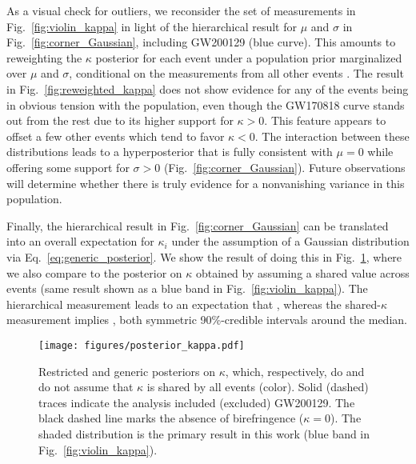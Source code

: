\documentclass[aps,prd,twocolumn,superscriptaddress,preprintnumbers,nofootinbib]{revtex4-2}
\begin{document}
As a visual check for outliers, we reconsider the set of measurements in Fig.~\ref{fig:violin_kappa} in light of the hierarchical result for $\mu$ and $\sigma$ in Fig.~\ref{fig:corner_Gaussian}, including GW200129 (blue curve).
This amounts to reweighting the $\kappa$ posterior for each event under a population prior marginalized over $\mu$ and $\sigma$, conditional on the measurements from all other events \cite{Miller2020,Callister:T2100301}.
The result in Fig.~\ref{fig:reweighted_kappa} does not show evidence for any of the events being in obvious tension with the population, even though the GW170818 curve stands out from the rest due to its higher support for $\kappa > 0$.
This feature appears to offset a few other events which tend to favor $\kappa < 0$.
The interaction between these distributions leads to a hyperposterior that is fully consistent with $\mu = 0$ while offering some support for $\sigma > 0$ (Fig.~\ref{fig:corner_Gaussian}).
Future observations will determine whether there is truly evidence for a nonvanishing variance in this population.

Finally, the hierarchical result in Fig.~\ref{fig:corner_Gaussian} can be translated into an overall expectation for $\kappa_i$ under the assumption of a Gaussian distribution via Eq.~\eqref{eq:generic_posterior}.
We show the result of doing this in Fig.~\ref{fig:posterior_kappa}, where we also compare to the posterior on $\kappa$ obtained by assuming a shared value across events (same result shown as a blue band in Fig.~\ref{fig:violin_kappa}).
The hierarchical measurement leads to an expectation that , whereas the shared-$\kappa$ measurement implies , both symmetric 90\%-credible intervals around the median.  

\begin{figure}
    \texttt{[image: figures/posterior\_kappa.pdf]}
    \caption{
        Restricted and generic posteriors on $\kappa$, which, respectively, do and do not assume that $\kappa$ is shared by all events (color).
        Solid (dashed) traces indicate the analysis included (excluded) GW200129.
        The black dashed line marks the absence of birefringence ($\kappa=0$).
        The shaded distribution is the primary result in this work (blue band in Fig.~\ref{fig:violin_kappa}).
    }
    \label{fig:posterior_kappa}
\end{figure}
\end{document}
